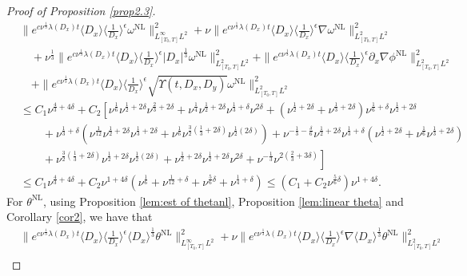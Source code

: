 \documentclass[reqno, 12pt]{amsart} %
\theoremstyle{plain} %
\theoremstyle{definition}
\theoremstyle{remark}
\numberwithin{equation}{section} %
\newcommand{\lt}{\left}
\newcommand{\rt}{\right}
\begin{document}
\begin{proof}[Proof of Proposition \ref{prop2.3}]
\begin{align*}
			& \| e^{c \nu^{\frac{1}{3}} \lambda\left(D_x\right) t}\langle D_x\rangle\langle\frac{1}{D_x}\rangle^\epsilon \omega^{\mathrm{NL}}\|_{L_{[T_0, T]}^\infty L^2}^2+\nu\|e^{c \nu^{\frac{1}{3}} \lambda\left(D_x\right) t}\langle D_x\rangle\langle\frac{1}{D_x}\rangle^\epsilon \nabla \omega^{\mathrm{NL}}\|_{L_{[T_0, T]}^2L^2}^2 \\
			& \quad+ \nu^{\frac{1}{3}}\|e^{c \nu^{\frac{1}{3}} \lambda\left(D_x\right) t}\langle D_x\rangle\langle\frac{1}{D_x}\rangle^\epsilon\left|D_x\right|^{\frac{1}{3}}  \omega^{\mathrm{NL}}\|_{L_{[T_0, T]}^2 L^2}^2  + \|e^{c \nu^{\frac{1}{3}} \lambda\left(D_x\right) t}\langle D_x\rangle\langle\frac{1}{D_x}\rangle^\epsilon \partial_x \nabla \phi^{\mathrm{NL}}\|_{L_{[T_0, T]}^2 L^2}^2
			\\
			& \quad+\|e^{c \nu^{\frac{1}{3}} \lambda\left(D_x\right) t}\langle D_x\rangle\langle\frac{1}{D_x}\rangle^\epsilon \sqrt{\Upsilon\left(t, D_x, D_y\right)} \omega^{\mathrm{NL}}\|_{L_{[T_0, T]}^2 L^2}^2 \\
			&\leq C_1\nu^{\frac43 + 4\delta }+ C_2\lt[ \nu^\frac16 \nu^{\frac12 + 2\delta} \nu^{\frac23 + 2\delta}  +  \nu^{\frac14}\nu^{\frac12 + 2\delta}\nu^{\frac13 + \delta}\nu^{  2\delta}   + (\nu^{\frac12 + 2\delta} + \nu^{\frac13 + 2\delta})\nu^{\frac16 + \delta}\nu^{\frac12 + 2\delta} \rt.\\
			&\lt.\qquad + \nu^{\frac13 + \delta}(\nu^{\frac1{12}}\nu^{\frac12 + 2\delta}\nu^{\frac13 + 2\delta}  + \nu^{\frac16 }\nu^{\frac32 (\frac13 + 2\delta)}\nu^{\frac12 (2\delta)}) + \nu^{-\frac13 - \frac\delta6}\nu^{\frac12 + 2\delta}\nu^{\frac13 +\delta}(\nu^{\frac12 + 2\delta}+ \nu^{\frac16}\nu^{\frac13 + 2\delta}) \rt.\\
			&\lt. \qquad   +  \nu^{\frac32(\frac13 + 2\delta)}\nu^{\frac12 + 2\delta}\nu^{\frac12 ( 2\delta)}   +  \nu^{\frac12 + 2\delta}\nu^{\frac12 + 2\delta}\nu^{ 2\delta}  + \nu^{-\frac13}\nu^{2(\frac23 + 3\delta)}\rt] \\
			&\leq  C_1\nu^{\frac43 + 4\delta }  + C_2 \nu^{1+4\delta}\left(  \nu^\frac16 + \nu^{\frac1{12} + \delta} + \nu^{\frac{5}{6} \delta} + \nu^{\frac1{4} + \delta}  \right) \leq (C_1 + C_2\nu^{\frac{5}{6} \delta} ) \nu^{1+4\delta} .
		\end{align*}
		For $\theta^{\mathrm{NL}}$, using Proposition \ref{lem:est of thetanl}, Proposition \ref{lem:linear theta} and Corollary \ref{cor2}, we have that
		\begin{align*}
			& \| e^{c \nu^{\frac{1}{3}} \lambda\left(D_x\right) t}\langle D_x\rangle\langle\frac{1}{D_x}\rangle^\epsilon \langle D_x \rangle^\frac13  \theta^{\mathrm{NL}}\|_{L_{[T_0, T]}^\infty L^2}^2+\nu\|e^{c \nu^{\frac{1}{3}} \lambda\left(D_x\right) t}\langle D_x\rangle\langle\frac{1}{D_x}\rangle^\epsilon \nabla \langle D_x \rangle^\frac13  \theta^{\mathrm{NL}}\|_{L_{[T_0, T]}^2 L^2}^2 \\

\end{align*}
\end{proof}
\end{document}
